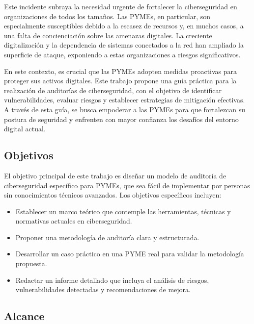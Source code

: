 \documentclass[a4paper, 10pt]{article}
\begin{document}
Este incidente subraya la necesidad urgente de fortalecer la ciberseguridad en organizaciones de todos los tamaños. Las PYMEs, en particular, son especialmente susceptibles debido a la escasez de recursos y, en muchos casos, a una falta de concienciación sobre las amenazas digitales. 
La creciente digitalización y la dependencia de sistemas conectados a la red han ampliado la superficie de ataque, exponiendo a estas organizaciones a riesgos significativos.
\par\vspace{0.5cm}

En este contexto, es crucial que las PYMEs adopten medidas proactivas para proteger sus activos digitales. Este trabajo propone una guía práctica para la realización de auditorías de ciberseguridad, con el objetivo de identificar vulnerabilidades, evaluar riesgos y establecer 
estrategias de mitigación efectivas. A través de esta guía, se busca empoderar a las PYMEs para que fortalezcan su postura de seguridad y enfrenten con mayor confianza los desafíos del entorno digital actual.

\clearpage



\subsection{Objetivos}

El objetivo principal de este trabajo es dise\~nar un modelo de auditor\'ia de ciberseguridad espec\'ifico para PYMEs, que sea f\'acil de implementar por personas sin conocimientos t\'ecnicos avanzados. Los objetivos espec\'ificos incluyen:

\begin{itemize}
    \item Establecer un marco te\'orico que contemple las herramientas, t\'ecnicas y normativas actuales en ciberseguridad.
    \item Proponer una metodolog\'ia de auditor\'ia clara y estructurada.
    \item Desarrollar un caso pr\'actico en una PYME real para validar la metodolog\'ia propuesta.
    \item Redactar un informe detallado que incluya el an\'alisis de riesgos, vulnerabilidades detectadas y recomendaciones de mejora.
\end{itemize}

\subsection{Alcance}
\end{document}
